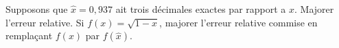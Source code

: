 
\begin{exercice}\label{exoSerieQuatre0007}

Supposons que $\hat{x}=0,937$ ait trois décimales exactes par rapport a $x$. Majorer l'erreur relative. Si $f(x)=\sqrt{1-x}$, majorer l'erreur relative commise en remplaçant $f(x)$ par $f(\hat{x})$.

\end{exercice}
